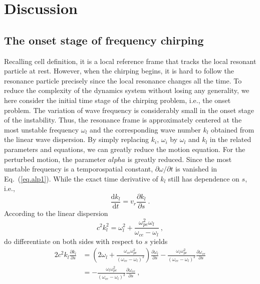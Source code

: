\section{Discussion}
\label{sec:dis}
\subsection{The onset stage of frequency chirping}
Recalling cell definition, it is a local reference frame that tracks the local resonant particle at rest.
However, when the chirping begins, it is hard to follow the resonance particle precisely since the local resonance changes all the time.
To reduce the complexity of the dynamics system without losing any generality, we here consider the initial time stage of the chirping problem, i.e., the onset problem.
The variation of wave frequency is considerably small in the onset stage of the instability. 
Thus, the resonance frame is approximately centered at the most unstable frequency $\omega_l$ and the corresponding wave number $k_l$ obtained from the linear wave dispersion.
By simply replacing $k_i$, $\omega_i$ by $\omega_l$ and $k_l$ in the related parameters and equations, we can greatly reduce the motion equation.
For the perturbed motion, the parameter $alpha$ is greatly reduced. Since the most unstable frequency is a temporospatial constant, $\partial \omega/\partial t$ is vanished in Eq.~(\ref{eq.alp1}).
While the exact time derivative of $k_l$ still has dependence on $s$, i.e.,
\begin{equation}
    \frac{\mathrm{d}k_l}{\mathrm{d}t}  = v_r \frac{\partial k_l}{\partial s}~.
\end{equation}
According to the linear dispersion
\begin{equation}
    c^2 k_l^2=\omega_l^2+\frac{\omega_{pe}^2\omega_l }{\omega_{ce}-\omega_l}~,
\end{equation}
do differentiate on both sides with respect to $s$ yields
\begin{equation}
    \begin{aligned}
    2 c^2 k_l \frac{\partial k_l}{\partial s}&=\left(2 \omega_l+\frac{\omega_{ce} \omega_{pe}^2}{\left(\omega_{ce}-\omega_l\right)^2}\right) \frac{\partial \omega_l}{\partial s}-\frac{\omega_l \omega_{pe}^2}{\left(\omega_{ce}-\omega_l\right)^2} \frac{\partial \omega_{ce}}{\partial s}
    \\
    & = -\frac{\omega_l \omega_{pe}^2}{\left(\omega_{ce}-\omega_l\right)^2} \frac{\partial \omega_{ce}}{\partial s}~,
    \end{aligned}
\end{equation}
